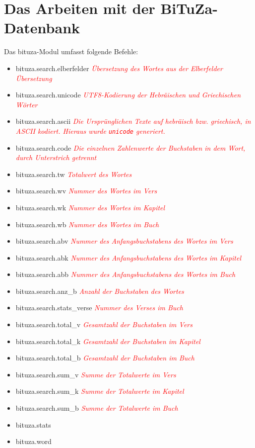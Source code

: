 \documentclass[a4paper]{scrartcl}
\let\origitem\item
\renewcommand{\item}{\normalfont\origitem}
\newcommand{\ttitem}{\normalfont\ttfamily\origitem}
\begin{document}
\section{Das Arbeiten mit der BiTuZa-Datenbank}

Das bituza-Modul umfasst folgende Befehle:

\begin{itemize}
\ttitem bituza.search.elberfelder \textcolor{red}{\small{\textit{Übersetzung des Wortes aus der Elberfelder Übersetzung}}\normalsize}
\ttitem bituza.search.unicode \textcolor{red}{\small{\textit{UTF8-Kodierung der Hebräischen und Griechischen Wörter}}\normalsize}
\ttitem bituza.search.ascii \textcolor{red}{\small{\textit{Die Ursprünglichen Texte auf hebräisch bzw. griechisch, in ASCII kodiert. Hieraus wurde \texttt{unicode} generiert.}}\normalsize}
\ttitem bituza.search.code \textcolor{red}{\small{\textit{Die einzelnen Zahlenwerte der Buchstaben in dem Wort, durch Unterstrich getrennt}}\normalsize}
\ttitem bituza.search.tw \textcolor{red}{\small{\textit{Totalwert des Wortes}}\normalsize}
\ttitem bituza.search.wv \textcolor{red}{\small{\textit{Nummer des Wortes im Vers}}\normalsize}
\ttitem bituza.search.wk \textcolor{red}{\small{\textit{Nummer des Wortes im Kapitel}}\normalsize}
\ttitem bituza.search.wb \textcolor{red}{\small{\textit{Nummer des Wortes im Buch}}\normalsize}
\ttitem bituza.search.abv \textcolor{red}{\small{\textit{Nummer des Anfangsbuchstabens des Wortes im Vers}}\normalsize}
\ttitem bituza.search.abk \textcolor{red}{\small{\textit{Nummer des Anfangsbuchstabens des Wortes im Kapitel}}\normalsize}
\ttitem bituza.search.abb \textcolor{red}{\small{\textit{Nummer des Anfangsbuchstabens des Wortes im Buch}}\normalsize}
\ttitem bituza.search.anz\_b \textcolor{red}{\small{\textit{Anzahl der Buchstaben des Wortes}}\normalsize}
\\
\ttitem bituza.search.stats\_verse \textcolor{red}{\small{\textit{Nummer des Verses im Buch}}\normalsize}
\ttitem bituza.search.total\_v \textcolor{red}{\small{\textit{Gesamtzahl der Buchstaben im Vers}}\normalsize}
\ttitem bituza.search.total\_k \textcolor{red}{\small{\textit{Gesamtzahl der Buchstaben im Kapitel}}\normalsize}
\ttitem bituza.search.total\_b \textcolor{red}{\small{\textit{Gesamtzahl der Buchstaben im Buch}}\normalsize}
\ttitem bituza.search.sum\_v \textcolor{red}{\small{\textit{Summe der Totalwerte im Vers}}\normalsize}
\ttitem bituza.search.sum\_k \textcolor{red}{\small{\textit{Summe der Totalwerte im Kapitel}}\normalsize}
\ttitem bituza.search.sum\_b \textcolor{red}{\small{\textit{Summe der Totalwerte im Buch}}\normalsize}
\\
\ttitem bituza.stats

\ttitem bituza.word
\end{itemize}
\end{document}
